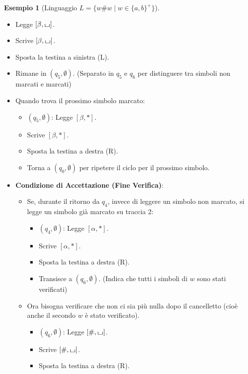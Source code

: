 \documentclass[a4paper]{article}
\theoremstyle{definition} %
\newtheorem{example}{Esempio}
\newcommand{\blankS}{\ensuremath{\raisebox{-0.15ex}{\scalebox{1.3}[0.7]{$\sqcup$}}}}
\begin{document}
\begin{example}[Linguaggio $L = \{w\#w \mid w \in \{a,b\}^+\}$]
\begin{itemize}
\begin{itemize}
            \item Legge $[\beta, \blankS]$.
            \item Scrive $[\beta, \blankS]$.
            \item Sposta la testina a sinistra (L).
            \item Rimane in $(q_5, \emptyset)$. (Separato in $q_5$ e $q_6$ per distinguere tra simboli non marcati e marcati)
            \item Quando trova il prossimo simbolo marcato:
                \begin{itemize}
                    \item $(q_5, \emptyset)$: Legge $[\beta, *]$.
                    \item Scrive $[\beta, *]$.
                    \item Sposta la testina a destra (R).
                    \item Torna a $(q_0, \emptyset)$ per ripetere il ciclo per il prossimo simbolo.
                \end{itemize}
            \item \textbf{Condizione di Accettazione (Fine Verifica)}:
                \begin{itemize}
                    \item Se, durante il ritorno da $q_4$, invece di leggere un simbolo non marcato, si legge un simbolo già marcato su traccia 2:
                        \begin{itemize}
                            \item $(q_4, \emptyset)$: Legge $[\alpha, *]$.
                            \item Scrive $[\alpha, *]$.
                            \item Sposta la testina a destra (R).
                            \item Transisce a $(q_6, \emptyset)$. (Indica che tutti i simboli di $w$ sono stati verificati)
                        \end{itemize}
                    \item Ora bisogna verificare che non ci sia più nulla dopo il cancelletto (cioè anche il secondo $w$ è stato verificato).
                        \begin{itemize}
                            \item $(q_6, \emptyset)$: Legge $[\#, \blankS]$.
                            \item Scrive $[\#, \blankS]$.
                            \item Sposta la testina a destra (R).

\end{itemize}
\end{itemize}
\end{itemize}
\end{itemize}
\end{example}
\end{document}

